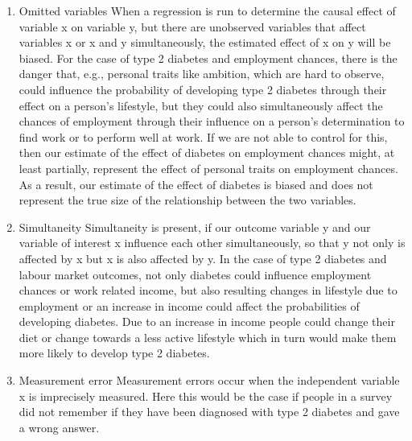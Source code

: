 \documentclass[12pt,english]{article}
\begin{document}
\begin{appendix}
\begin{enumerate}
\item 	Omitted variables
When a regression is run to determine the causal effect of variable x on variable y, but there are unobserved variables that affect variables x or x and y simultaneously, the estimated effect of x on y will be biased. For the case of type 2 diabetes and employment chances, there is the danger that, e.g., personal traits like ambition, which are hard to observe, could influence the probability of developing type 2 diabetes through their effect on a person's lifestyle, but they could also simultaneously affect the chances of employment through their influence on a person's determination to find work or to perform well at work. If we are not able to control for this, then our estimate of the effect of diabetes on employment chances might, at least partially, represent the effect of personal traits on employment chances. As a result, our estimate of the effect of diabetes is biased and does not represent the true size of the relationship between the two variables.
\item 	Simultaneity
Simultaneity is present, if our outcome variable y and our variable of interest x influence each other simultaneously, so that y not only is affected by x but x is also affected by y. In the case of type 2 diabetes and labour market outcomes, not only diabetes could influence employment chances or work related income, but also resulting changes in lifestyle due to employment or an increase in income could affect the probabilities of developing diabetes. Due to an increase in income people could change their diet or change towards a less active lifestyle which in turn would make them more likely to develop type 2 diabetes.
\item 	Measurement error
Measurement errors occur when the independent variable x is imprecisely measured. Here this would be the case if people in a survey did not remember if they have been diagnosed with type 2 diabetes and gave a wrong answer.
\end{enumerate}


\end{appendix}
\end{document}
